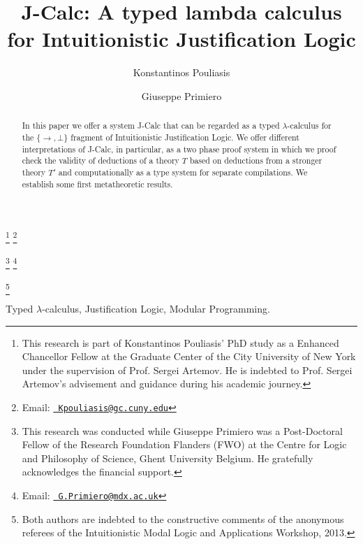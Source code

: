 \documentclass[11pt]{entcs}
\begin{document}
\begin{frontmatter}


\title{J-Calc: A typed lambda calculus for Intuitionistic Justification Logic}

\author{Konstantinos Pouliasis}
\address{Department of Computer Science\\
The Graduate Center at City University of New York, \\
NY, USA}
\thanks[K]{This research is part of Konstantinos Pouliasis' PhD study as a Enhanced Chancellor Fellow at the Graduate Center of the City University of New York under the supervision of Prof. Sergei Artemov. He is indebted to Prof. Sergei Artemov's advisement and guidance during his academic journey.} 
\thanks[email]{Email:
\href{mailto:Kpouliasis@gc.cuny.edu} 
{\texttt{\normalshape
        Kpouliasis@gc.cuny.edu}}}



\author{Giuseppe Primiero} 
\address{Department of Computer Science\\ 
Middlesex University\\
United Kingdom}



\thanks[g]{This research was conducted while Giuseppe Primiero was a Post-Doctoral Fellow of the Research Foundation Flanders (FWO) at the Centre for Logic and Philosophy of Science, Ghent University Belgium. He gratefully acknowledges the financial support.}
                \thanks[coemail]{Email:
    \href{mailto:G.Primiero@mdx.ac.uk} {\texttt{\normalshape
        G.Primiero@mdx.ac.uk}}}

\thanks[all]{Both authors are indebted to the constructive comments of the anonymous referees of the Intuitionistic Modal Logic and Applications Workshop, 2013.}

 \begin{abstract}
In this paper we offer a system J-Calc that can be regarded as a typed $\lambda$-calculus for the $\{\rightarrow, \bot\}$ fragment of Intuitionistic Justification Logic. We offer different interpretations of J-Calc, in particular, as a two phase  proof system in which we proof check the validity of deductions of a  theory $T$ based on deductions from a stronger theory $T'$ and computationally as a type system for separate compilations. We establish some first metatheoretic results.
\end{abstract}

\begin{keyword}
Typed $\lambda$-calculus, Justification Logic, Modular Programming.
\end{keyword}


\end{frontmatter}
\end{document}
